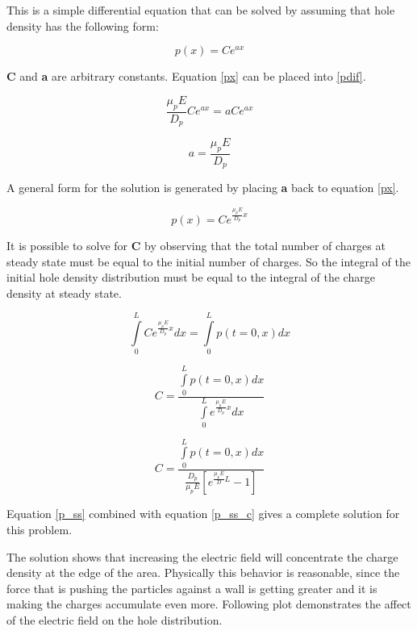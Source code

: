 \begin{doublespace}
This is a simple differential equation that can be solved by assuming that hole density has the following form:

\begin{equation}
p(x)=Ce^{ax}
\label{px}
\end{equation}

\textbf{C} and \textbf{a} are arbitrary constants. Equation \eqref{px} can be placed into \eqref{pdif}.

\begin{equation}
 \frac{\mu_{p} E}{D_{p}} Ce^{ax}  = a Ce^{ax}
\end{equation}

\begin{equation}
a=\frac{\mu_{p} E}{D_{p}}
\end{equation}

 A general form for the solution is generated by placing \textbf{a} back to equation \eqref{px}.
 
\begin{equation}
p(x)=Ce^{\frac{\mu_{p} E}{D_{p}}x}
\label{p_ss}
\end{equation}

It is possible to solve for \textbf{C} by observing that the total number of charges at steady state must be equal to the initial number of charges. So the integral of the initial hole density distribution must be equal to the integral of the charge density at steady state.


\begin{equation}\nonumber
\int\limits_{0}^{L}Ce^{\frac{\mu_{p} E}{D_{p}}x}dx=\int\limits_{0}^{L}p(t=0,x)dx
\end{equation}

\begin{equation}\nonumber
C=\frac{\int\limits_{0}^{L}p(t=0,x)dx}{\int\limits_{0}^{L}e^{\frac{\mu_{p} E}{D_{p}}x}dx}
\end{equation}

\begin{equation}
C=\frac{\int\limits_{0}^{L}p(t=0,x)dx}{\frac{D_p}{\mu_p E}[e^{\frac{\mu_p E}{D} L} -1]}
\label{p_ss_c}
\end{equation}

Equation \ref{p_ss} combined with equation \ref{p_ss_c} gives a complete solution for this problem.

The solution shows that increasing the electric field will concentrate the charge density at the edge of the area. Physically this behavior is reasonable, since the force that is pushing the particles against a wall is getting greater and it is making the charges accumulate even more. Following plot demonstrates the affect of the electric field on the hole distribution.


\end{doublespace}
